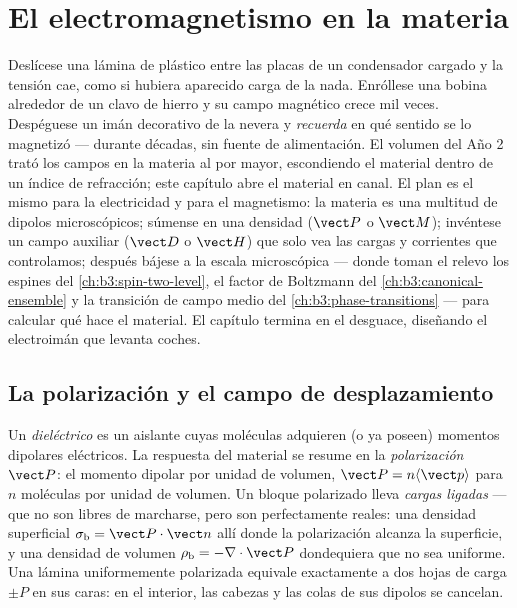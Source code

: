 \chapter{El electromagnetismo en la materia}\label{ch:b3:electromagnetism-in-matter}


Deslícese una lámina de plástico entre las placas de un condensador cargado y la
tensión cae, como si hubiera aparecido carga de la nada. Enróllese una bobina
alrededor de un clavo de hierro y su campo magnético crece mil veces. Despéguese
un imán decorativo de la nevera y \emph{recuerda} en qué
sentido se lo magnetizó --- durante décadas, sin fuente de alimentación. El volumen
del Año 2 trató los campos en la materia al por mayor, escondiendo el material dentro
de un índice de refracción; este capítulo abre el material en canal. El plan
es el mismo para la electricidad y para el magnetismo: la materia es una multitud de
dipolos microscópicos; súmense en una densidad ($\vect P$ o $\vect M$);
invéntese un campo auxiliar ($\vect D$ o $\vect H$) que solo vea las
cargas y corrientes que controlamos; después bájese a la escala microscópica
--- donde toman el relevo los espines del \cref{ch:b3:spin-two-level}, el factor de
Boltzmann del \cref{ch:b3:canonical-ensemble} y la transición de campo medio del
\cref{ch:b3:phase-transitions} --- para calcular qué hace el
material. El capítulo termina en el desguace, diseñando el
electroimán que levanta coches.

\section{La polarización y el campo de desplazamiento}

\begin{definition}\label{def:b3:electromagnetism-in-matter:polarisation}
Un \emph{dieléctrico} es un aislante cuyas moléculas adquieren (o
ya poseen) momentos dipolares eléctricos. La respuesta del material se
resume en la \emph{polarización} $\vect P$: el momento dipolar
por unidad de volumen, $\vect P = n\langle\vect p\rangle$ para $n$ moléculas
por unidad de volumen. Un bloque polarizado lleva \emph{cargas ligadas} ---
que no son libres de marcharse, pero son perfectamente reales: una densidad superficial
$\sigma_{\text{b}} = \vect P\cdot\vect n$ allí donde la polarización
alcanza la superficie, y una densidad de volumen $\rho_{\text{b}} =
-\nabla\cdot\vect P$ dondequiera que no sea uniforme. Una lámina uniformemente
polarizada equivale exactamente a dos hojas de carga $\pm P$
en sus caras: en el interior, las cabezas y las colas de sus dipolos se cancelan.
\end{definition}

